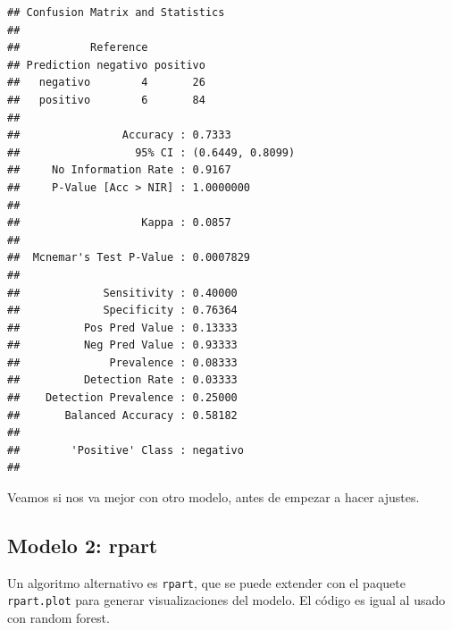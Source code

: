 \documentclass[
]{book}
\newenvironment{Shaded}{\begin{snugshade}}{\end{snugshade}}
\newcommand{\FunctionTok}[1]{\textcolor[rgb]{0.00,0.00,0.00}{#1}}
\newcommand{\NormalTok}[1]{#1}
\newcommand{\SpecialCharTok}[1]{\textcolor[rgb]{0.00,0.00,0.00}{#1}}
\begin{document}
\begin{Shaded}
\end{Shaded}

\begin{verbatim}
## Confusion Matrix and Statistics
## 
##           Reference
## Prediction negativo positivo
##   negativo        4       26
##   positivo        6       84
##                                           
##                Accuracy : 0.7333          
##                  95% CI : (0.6449, 0.8099)
##     No Information Rate : 0.9167          
##     P-Value [Acc > NIR] : 1.0000000       
##                                           
##                   Kappa : 0.0857          
##                                           
##  Mcnemar's Test P-Value : 0.0007829       
##                                           
##             Sensitivity : 0.40000         
##             Specificity : 0.76364         
##          Pos Pred Value : 0.13333         
##          Neg Pred Value : 0.93333         
##              Prevalence : 0.08333         
##          Detection Rate : 0.03333         
##    Detection Prevalence : 0.25000         
##       Balanced Accuracy : 0.58182         
##                                           
##        'Positive' Class : negativo        
## 
\end{verbatim}

Veamos si nos va mejor con otro modelo, antes de empezar a hacer ajustes.

\hypertarget{modelo-2-rpart}{%
\subsection{Modelo 2: rpart}\label{modelo-2-rpart}}

Un algoritmo alternativo es \texttt{rpart}, que se puede extender con el paquete \texttt{rpart.plot} para generar visualizaciones del modelo. El código es igual al usado con random forest.
\end{document}
